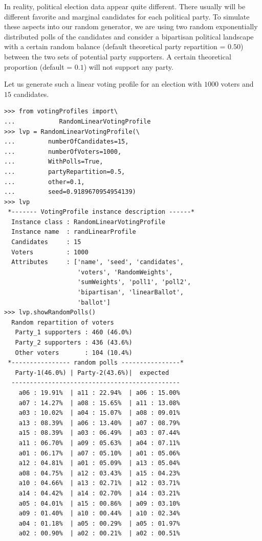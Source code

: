In reality, political election data appear quite different. There usually will be different favorite and marginal candidates for each political party. To simulate these aspects into our random generator, we are using two random exponentially distributed polls of the candidates and consider a bipartisan political landscape with a certain random balance (default theoretical party repartition = $0.50$) between the two sets of potential party supporters. A certain theoretical proportion (default = $0.1$) will not support any party.

Let us generate such a linear voting profile for an election with $1000$ voters and $15$ candidates.

\begin{lstlisting}[caption={Generating a linear voting profile with random polls},label=list:7.7]
>>> from votingProfiles import\
...            RandomLinearVotingProfile
>>> lvp = RandomLinearVotingProfile(\
...         numberOfCandidates=15,
...         numberOfVoters=1000,
...         WithPolls=True,
...         partyRepartition=0.5,
...         other=0.1,
...         seed=0.9189670954954139)
>>> lvp
 *------- VotingProfile instance description ------*
  Instance class : RandomLinearVotingProfile
  Instance name  : randLinearProfile
  Candidates     : 15
  Voters         : 1000
  Attributes     : ['name', 'seed', 'candidates',
                    'voters', 'RandomWeights',
                    'sumWeights', 'poll1', 'poll2',
                    'bipartisan', 'linearBallot',
                    'ballot']
>>> lvp.showRandomPolls()
  Random repartition of voters
   Party_1 supporters : 460 (46.0%)
   Party_2 supporters : 436 (43.6%)
   Other voters       : 104 (10.4%)
 *---------------- random polls ----------------*
   Party-1(46.0%) | Party-2(43.6%)|  expected  
  ----------------------------------------------
    a06 : 19.91%  | a11 : 22.94%  | a06 : 15.00%
    a07 : 14.27%  | a08 : 15.65%  | a11 : 13.08%
    a03 : 10.02%  | a04 : 15.07%  | a08 : 09.01%
    a13 : 08.39%  | a06 : 13.40%  | a07 : 08.79%
    a15 : 08.39%  | a03 : 06.49%  | a03 : 07.44%
    a11 : 06.70%  | a09 : 05.63%  | a04 : 07.11%
    a01 : 06.17%  | a07 : 05.10%  | a01 : 05.06%
    a12 : 04.81%  | a01 : 05.09%  | a13 : 05.04%
    a08 : 04.75%  | a12 : 03.43%  | a15 : 04.23%
    a10 : 04.66%  | a13 : 02.71%  | a12 : 03.71%
    a14 : 04.42%  | a14 : 02.70%  | a14 : 03.21%
    a05 : 04.01%  | a15 : 00.86%  | a09 : 03.10%
    a09 : 01.40%  | a10 : 00.44%  | a10 : 02.34%
    a04 : 01.18%  | a05 : 00.29%  | a05 : 01.97%
    a02 : 00.90%  | a02 : 00.21%  | a02 : 00.51%
\end{lstlisting}

